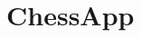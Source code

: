 \chapter{Chess\+App}
\hypertarget{md__r_e_a_d_m_e}{}\label{md__r_e_a_d_m_e}
\label{md__r_e_a_d_m_e_autotoc_md0}%
%
